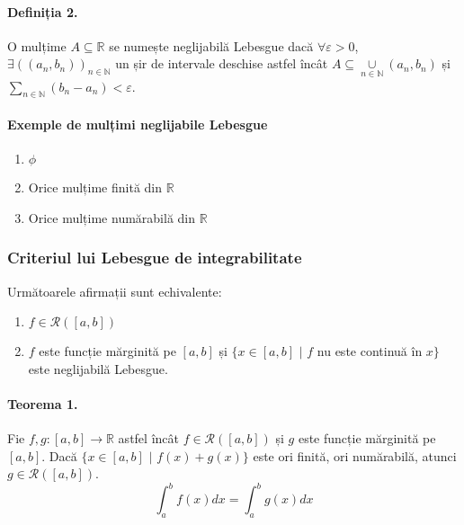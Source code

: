 \paragraph{Definiția 2.}
O mulțime $A \subseteq \mathbb{R}$ se numește neglijabilă Lebesgue dacă $\forall \varepsilon > 0$,
$\exists ((a_{n}, b_{n}))_{n \in \mathbb{N}}$ un șir de intervale deschise astfel încât
$A \subseteq \underset{n \in \mathbb{N}}{\cup} (a_{n}, b_{n})$ și $\displaystyle\sum_{n \in \mathbb{N}}(b_{n}-a_{n}) < \varepsilon$.

\paragraph{Exemple de mulțimi neglijabile Lebesgue}
\begin{enumerate}[label=\emph{\arabic*})]
    \item $\phi$
    \item Orice mulțime finită din $\mathbb{R}$
    \item Orice mulțime numărabilă din $\mathbb{R}$
\end{enumerate}

\subsubsection{Criteriul lui Lebesgue de integrabilitate}
Următoarele afirmații sunt echivalente:


\begin{enumerate}[label=\emph{\alph*})]
    \item $f \in \mathcal{R}([a,b])$
    \item $f$ este funcție mărginită pe $[a,b]$ și $\{ x \in [a,b]$ $\vert$ $f$ nu este continuă în $x \}$ este neglijabilă Lebesgue.
\end{enumerate}

\paragraph{Teorema 1.}
Fie $f, g:[a,b] \rightarrow \mathbb{R}$ astfel încât $f \in \mathcal{R}([a,b])$ și $g$ este funcție mărginită pe $[a,b]$.
Dacă $\{ x \in [a,b]$ $\vert$ $f(x) + g(x) \}$ este ori finită, ori numărabilă, atunci $g \in \mathcal{R}([a,b])$.
\begin{equation*}
    \displaystyle\int_{a}^{b}f(x)dx = \displaystyle\int_{a}^{b}g(x)dx
\end{equation*}


